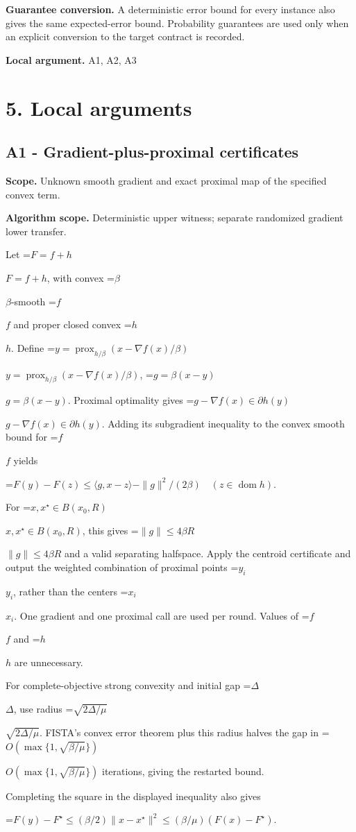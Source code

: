 \documentclass[10pt,a4paper]{article}
\newcommand{\AtlasMath}[1]{\par\begingroup\centering\setbox0=\hbox{$\displaystyle #1$}\ifdim\wd0>1.4\linewidth\typeout{ATLAS WIDE FORMULA: \the\wd0}\fi\ifdim\wd0>\linewidth\resizebox{\linewidth}{!}{\box0}\else\box0\fi\par\endgroup}
\newcommand{\AtlasInlineMath}[1]{\begingroup\setbox0=\hbox{$#1$}\ifdim\wd0>.4\linewidth\endgroup\AtlasMath{#1}\else\endgroup$#1$\fi}
\begin{document}
\textbf{Guarantee conversion.} A deterministic error bound for every instance also gives the same expected-error bound. Probability guarantees are used only when an explicit conversion to the target contract is recorded.

\textbf{Local argument.} A1, A2, A3

\section{5. Local arguments}
\subsection{A1 - Gradient-plus-proximal certificates}
\textbf{Scope.} Unknown smooth gradient and exact proximal map of the specified convex term.

\textbf{Algorithm scope.} Deterministic upper witness; separate randomized gradient lower transfer.

Let \AtlasInlineMath{F=f+h}, with convex \AtlasInlineMath{\beta}-smooth \AtlasInlineMath{f} and proper closed convex \AtlasInlineMath{h}. Define
\AtlasInlineMath{y=\operatorname{prox}_{h/\beta}(x-\nabla f(x)/\beta)}, \AtlasInlineMath{g=\beta(x-y)}.
Proximal optimality gives \AtlasInlineMath{g-\nabla f(x)\in\partial h(y)}. Adding its subgradient inequality to the convex smooth bound for \AtlasInlineMath{f} yields

\AtlasMath{F(y)-F(z)\le\langle g,x-z\rangle-\|g\|^2/(2\beta)
\quad(z\in\operatorname{dom}h).}

For \AtlasInlineMath{x,x^\star\in B(x_0,R)}, this gives \AtlasInlineMath{\|g\|\le4\beta R} and a valid separating halfspace. Apply the centroid certificate and output the weighted combination of proximal points \AtlasInlineMath{y_i}, rather than the centers \AtlasInlineMath{x_i}. One gradient and one proximal call are used per round. Values of \AtlasInlineMath{f} and \AtlasInlineMath{h} are unnecessary.

For complete-objective strong convexity and initial gap \AtlasInlineMath{\Delta}, use radius \AtlasInlineMath{\sqrt{2\Delta/\mu}}. FISTA's convex error theorem plus this radius halves the gap in \AtlasInlineMath{O(\max\{1,\sqrt{\beta/\mu}\})} iterations, giving the restarted bound.

Completing the square in the displayed inequality also gives

\AtlasMath{F(y)-F^\star\le(\beta/2)\|x-x^\star\|^2
\le(\beta/\mu)(F(x)-F^\star).}
\end{document}
